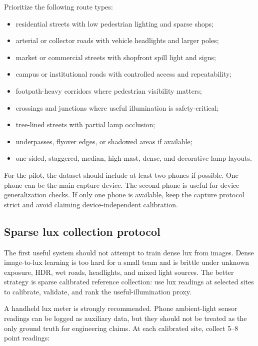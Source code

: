\documentclass[11pt]{article}
\begin{document}
Prioritize the following route types:
\begin{itemize}
  \item residential streets with low pedestrian lighting and sparse shops;
  \item arterial or collector roads with vehicle headlights and larger poles;
  \item market or commercial streets with shopfront spill light and signs;
  \item campus or institutional roads with controlled access and repeatability;
  \item footpath-heavy corridors where pedestrian visibility matters;
  \item crossings and junctions where useful illumination is safety-critical;
  \item tree-lined streets with partial lamp occlusion;
  \item underpasses, flyover edges, or shadowed areas if available;
  \item one-sided, staggered, median, high-mast, dense, and decorative lamp layouts.
\end{itemize}

For the pilot, the dataset should include at least two phones if possible. One phone can be the main capture device. The second phone is useful for device-generalization checks. If only one phone is available, keep the capture protocol strict and avoid claiming device-independent calibration.

\subsection{Sparse lux collection protocol}

The first useful system should not attempt to train dense lux from images. Dense image-to-lux learning is too hard for a small team and is brittle under unknown exposure, HDR, wet roads, headlights, and mixed light sources. The better strategy is sparse calibrated reference collection: use lux readings at selected sites to calibrate, validate, and rank the useful-illumination proxy.

A handheld lux meter is strongly recommended. Phone ambient-light sensor readings can be logged as auxiliary data, but they should not be treated as the only ground truth for engineering claims. At each calibrated site, collect 5--8 point readings:
\end{document}

